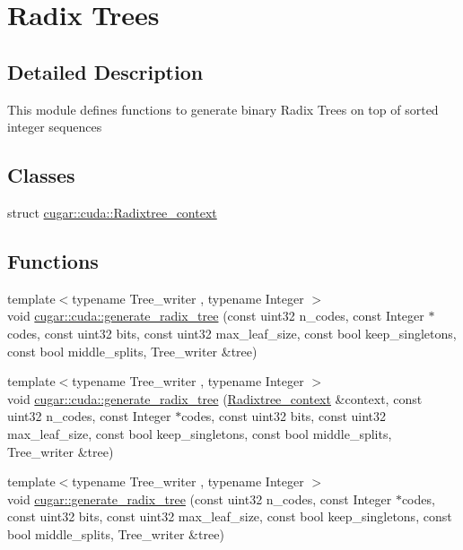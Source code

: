 \hypertarget{group__radixtree}{}\section{Radix Trees}
\label{group__radixtree}


\subsection{Detailed Description}
This module defines functions to generate binary Radix Trees on top of sorted integer sequences \subsection*{Classes}
\begin{DoxyCompactItemize}
\item 
struct \hyperlink{structcugar_1_1cuda_1_1_radixtree__context}{cugar\+::cuda\+::\+Radixtree\+\_\+context}
\end{DoxyCompactItemize}
\subsection*{Functions}
\begin{DoxyCompactItemize}
\item 
{\footnotesize template$<$typename Tree\+\_\+writer , typename Integer $>$ }\\void \hyperlink{group__radixtree_gafb888a81f085548c89a282181d74649a}{cugar\+::cuda\+::generate\+\_\+radix\+\_\+tree} (const uint32 n\+\_\+codes, const Integer $\ast$codes, const uint32 bits, const uint32 max\+\_\+leaf\+\_\+size, const bool keep\+\_\+singletons, const bool middle\+\_\+splits, Tree\+\_\+writer \&tree)
\item 
{\footnotesize template$<$typename Tree\+\_\+writer , typename Integer $>$ }\\void \hyperlink{group__radixtree_ga5993c99673b557cb58a86ec0fbb39e35}{cugar\+::cuda\+::generate\+\_\+radix\+\_\+tree} (\hyperlink{structcugar_1_1cuda_1_1_radixtree__context}{Radixtree\+\_\+context} \&context, const uint32 n\+\_\+codes, const Integer $\ast$codes, const uint32 bits, const uint32 max\+\_\+leaf\+\_\+size, const bool keep\+\_\+singletons, const bool middle\+\_\+splits, Tree\+\_\+writer \&tree)
\item 
{\footnotesize template$<$typename Tree\+\_\+writer , typename Integer $>$ }\\void \hyperlink{group__radixtree_gafa925282e2b6e8bd87c1a00c1f1e6807}{cugar\+::generate\+\_\+radix\+\_\+tree} (const uint32 n\+\_\+codes, const Integer $\ast$codes, const uint32 bits, const uint32 max\+\_\+leaf\+\_\+size, const bool keep\+\_\+singletons, const bool middle\+\_\+splits, Tree\+\_\+writer \&tree)
\end{DoxyCompactItemize}


